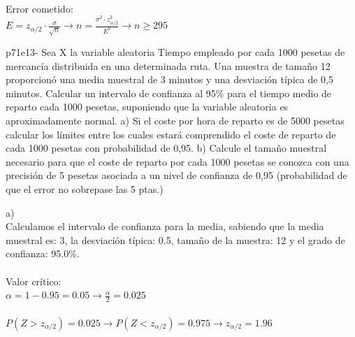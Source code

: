 \documentclass[spanish, 11pt]{exam}
\begin{document}
\begin{questions}
\begin{solution}
     \\
    Error cometido: \\ $E=z_{\alpha/2}\cdot \frac{\sigma}{\sqrt{n}} \to n =\frac{\sigma^2 \cdot z_{\alpha / 2}^2}{E^2} \to n \geq295$ \\    \end{solution}\question p71e13- Sea X la variable aleatoria Tiempo empleado por cada 1000 pesetas de mercancía distribuida en una
determinada ruta. Una muestra de tamaño 12 proporcionó una media muestral de 3 minutos y una desviación
típica de 0,5 minutos. Calcular un intervalo de confianza al 95\% para el tiempo medio de reparto cada 1000
pesetas, suponiendo que la variable aleatoria es aproximadamente normal.
a) Si el coste por hora de reparto es de 5000 pesetas calcular los límites entre los cuales estará
comprendido el coste de reparto de cada 1000 pesetas con probabilidad de 0,95.
b) Calcule el tamaño muestral necesario para que el coste de reparto por cada 1000 pesetas se conozca
con una precisión de 5 pesetas asociada a un nivel de confianza de 0,95 (probabilidad de que el error
no sobrepase las 5 ptas.) \begin{solution}   a) \\Calculamos el intervalo de confianza para la media, sabiendo que la media muestral es: 3, la desviación típica: 0.5, tamaño de la muestra: 12 y el grado de confianza: 95.0\%. \\ \\ Valor crítico: \\ $\alpha=1-0.95=0.05\to \frac{\alpha}{2}=0.025$ \\ \\ $P(Z>z_{\alpha/2})=0.025\to P(Z<z_{\alpha/2})=0.975 \to z_{\alpha/2} =1.96$ \\ 

\end{solution}
\end{questions}
\end{document}
